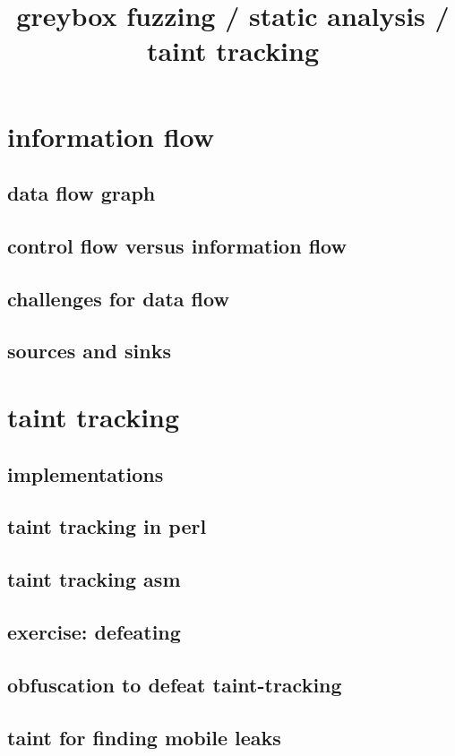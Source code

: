 \graphicspath{{./figures/}}
\title{greybox fuzzing / static analysis / taint tracking}
\date{}

\begin{frame}
    \titlepage
\end{frame}



\section{information flow}


\subsection{data flow graph}


\subsection{control flow versus information flow} 


\subsection{challenges for data flow}


\subsection{sources and sinks}


\section{taint tracking}


\subsection{implementations}


\subsection{taint tracking in perl}


\subsection{taint tracking asm}


\subsection{exercise: defeating} 


\subsection{obfuscation to defeat taint-tracking}


\subsection{taint for finding mobile leaks}



